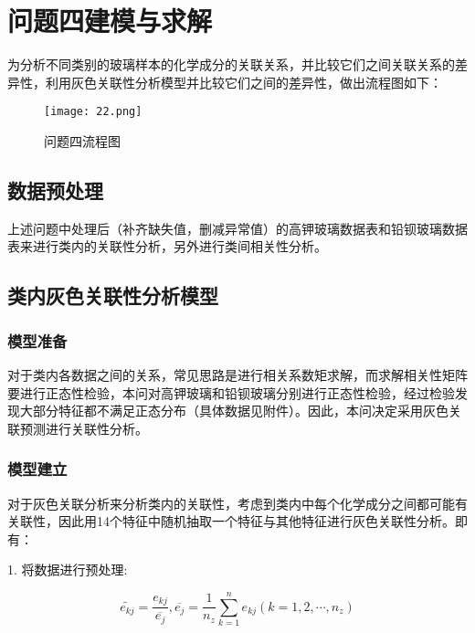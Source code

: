 \section{问题四建模与求解}

为分析不同类别的玻璃样本的化学成分的关联关系，并比较它们之间关联关系的差异性，利用灰色关联性分析模型并比较它们之间的差异性，做出流程图如下：

\begin{figure}[H] 
	\centering %
	\texttt{[image: 22.png]} %
	\caption{问题四流程图} %
	\label{Fig.main23} %
\end{figure}


\subsection{数据预处理}

上述问题中处理后（补齐缺失值，删减异常值）的高钾玻璃数据表和铅钡玻璃数据表来进行类内的关联性分析，另外进行类间相关性分析。

\subsection{类内灰色关联性分析模型}

\subsubsection{模型准备}

对于类内各数据之间的关系，常见思路是进行相关系数矩求解，而求解相关性矩阵要进行正态性检验，本问对高钾玻璃和铅钡玻璃分别进行正态性检验，经过检验发现大部分特征都不满足正态分布（具体数据见附件）。因此，本问决定采用灰色关联预测进行关联性分析。

\subsubsection{模型建立}

对于灰色关联分析来分析类内的关联性，考虑到类内中每个化学成分之间都可能有关联性，因此用14个特征中随机抽取一个特征与其他特征进行灰色关联性分析。即有：

1. 将数据进行预处理:

\begin{equation}
    \widetilde{{{e}_{kj}}}=\frac{{{e}_{kj}}}{\overline{{{e}_{j}}}},\overline{{{e}_{j}}}=\frac{1}{{{n}_{z}}}\sum\limits_{k=1}^{n}{{{e}_{kj}}}(k=1,2,\cdots ,{{n}_{z}})
\end{equation}

